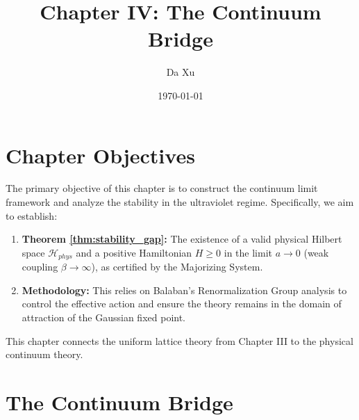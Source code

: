 \documentclass[11pt,a4paper]{report}
\title{Chapter IV: The Continuum Bridge}
\author{Da Xu}
\date{\today}
\begin{document}
\maketitle

\chapter*{Chapter Objectives}
The primary objective of this chapter is to construct the continuum limit framework and analyze the stability in the ultraviolet regime. Specifically, we aim to establish:
\begin{enumerate}
    \item \textbf{Theorem \ref{thm:stability_gap}:} The existence of a valid physical Hilbert space $\mathcal{H}_{phys}$ and a positive Hamiltonian $H \ge 0$ in the limit $a \to 0$ (weak coupling $\beta \to \infty$), as certified by the Majorizing System.
    \item \textbf{Methodology:} This relies on Balaban's Renormalization Group analysis to control the effective action and ensure the theory remains in the domain of attraction of the Gaussian fixed point.
\end{enumerate}
This chapter connects the uniform lattice theory from Chapter III to the physical continuum theory.

\tableofcontents

\chapter{The Continuum Bridge}




\appendix











\printbibliography[heading=subbibliography, title={References for Chapter 4}]
\end{document}
